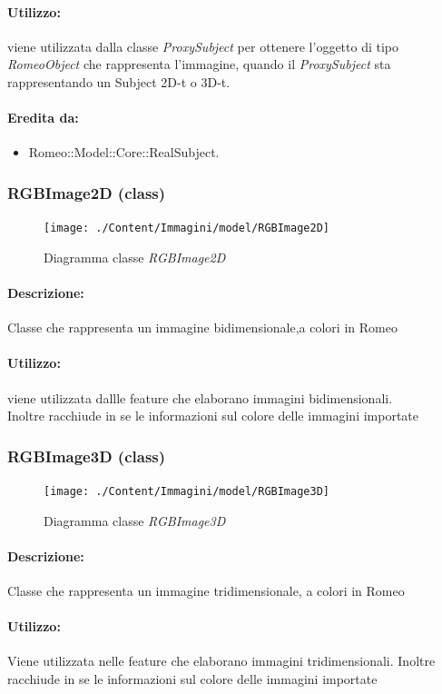 	\paragraph{Utilizzo:} viene utilizzata dalla classe \textsl{ProxySubject} per ottenere l'oggetto di tipo \textsl{RomeoObject} che rappresenta l'immagine, quando il \textsl{ProxySubject} sta rappresentando un Subject\g{} 2D-t o 3D-t.
	\paragraph{Eredita da:}
		\begin{itemize}
			\item Romeo::Model::Core::RealSubject.
		\end{itemize}
	\subsubsection{RGBImage2D (class)}
	\begin{figure}[!h]
		\centering
		\texttt{[image: ./Content/Immagini/model/RGBImage2D]}
		\caption{Diagramma classe \textsl{RGBImage2D}}
	\end{figure}
	\paragraph{Descrizione:} Classe che rappresenta un immagine bidimensionale,a colori in Romeo\g{}
	\paragraph{Utilizzo:} viene utilizzata dallle feature\g{} che elaborano immagini bidimensionali.
\\Inoltre racchiude in se le informazioni sul colore delle immagini importate
	\subsubsection{RGBImage3D (class)}
	\begin{figure}[!h]
		\centering
		\texttt{[image: ./Content/Immagini/model/RGBImage3D]}
		\caption{Diagramma classe \textsl{RGBImage3D}}
	\end{figure}
	\paragraph{Descrizione:} Classe che rappresenta un immagine tridimensionale, a colori in Romeo\g{}
	\paragraph{Utilizzo:} Viene utilizzata nelle feature\g{} che elaborano immagini tridimensionali.
Inoltre racchiude in se le informazioni sul colore delle immagini importate
